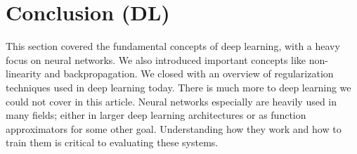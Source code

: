 \section{Conclusion (DL)}
\begin{flushleft}
    \large This section covered the fundamental concepts of deep learning, with a heavy focus on neural networks. We also introduced important concepts like non-linearity and backpropagation. We closed with an overview of regularization techniques used in deep learning today. There is much more to deep learning we could not cover in this article. Neural networks especially are heavily used in many fields; either in larger deep learning architectures or as function approximators for some other goal. Understanding how they work and how to train them is critical to evaluating these systems. \break
\end{flushleft}